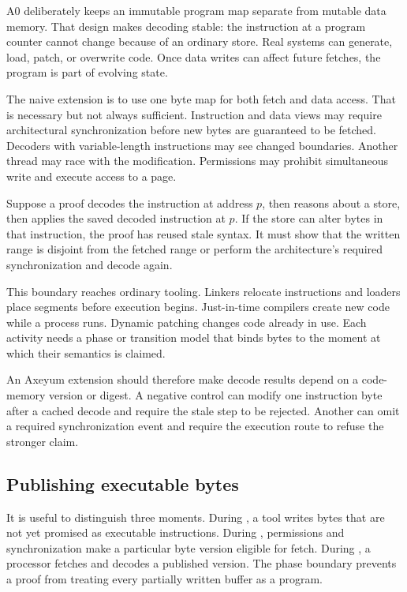 A0 deliberately keeps an immutable program map separate from mutable data
memory. That design makes decoding stable: the instruction at a program
counter cannot change because of an ordinary store. Real systems can generate,
load, patch, or overwrite code. Once data writes can affect future fetches, the
program is part of evolving state.

The naive extension is to use one byte map for both fetch and data access. That
is necessary but not always sufficient. Instruction and data views may require
architectural synchronization before new bytes are guaranteed to be fetched.
Decoders with variable-length instructions may see changed boundaries. Another
thread may race with the modification. Permissions may prohibit simultaneous
write and execute access to a page.

\begin{example}[title={A store can invalidate the next proof step}]
Suppose a proof decodes the instruction at address \(p\), then reasons about a
store, then applies the saved decoded instruction at \(p\). If the store can
alter bytes in that instruction, the proof has reused stale syntax. It must
show that the written range is disjoint from the fetched range or perform the
architecture's required synchronization and decode again.
\end{example}

This boundary reaches ordinary tooling. Linkers relocate instructions and
loaders place segments before execution begins. Just-in-time compilers create
new code while a process runs. Dynamic patching changes code already in use.
Each activity needs a phase or transition model that binds bytes to the moment
at which their semantics is claimed.

An Axeyum extension should therefore make decode results depend on a code-memory
version or digest. A negative control can modify one instruction byte after a
cached decode and require the stale step to be rejected. Another can omit a
required synchronization event and require the execution route to refuse the
stronger claim.

\subsection{Publishing executable bytes}

It is useful to distinguish three moments. During , a
tool writes bytes that are not yet promised as executable instructions. During
, permissions and synchronization make a particular byte
version eligible for fetch. During , a processor fetches
and decodes a published version. The phase boundary prevents a proof from
treating every partially written buffer as a program.

